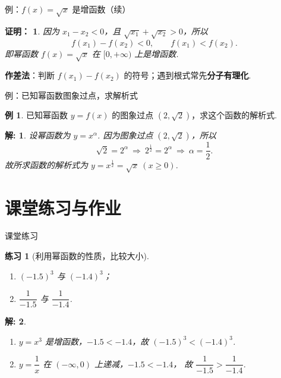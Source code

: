 \documentclass[aspectratio=169,13pt,t] {beamer}
\newtheorem*{prooft}{证明：}
\newtheorem{question}{练习}
\newtheorem*{solve}{解:}
\theoremstyle{definition}
\newtheorem{exam}{例}
\begin{document}
\begin{frame}{例：$f(x)=\sqrt{x}$ 是增函数（续）}
	\begin{prooft}
		因为 $x_{1}-x_{2}<0$，且 $\sqrt{x_{1}}+\sqrt{x_{2}}>0$，所以
		\[
			f(x_{1})-f(x_{2})<0,\qquad f(x_{1})<f(x_{2}).
		\]
		即幂函数 $f(x)=\sqrt{x}$ 在 $[0,+\infty)$ 上是增函数.
	\end{prooft}
	\vspace{1em}
	\begin{summarybox}[方法提炼]
		\textbf{作差法}：判断 $f(x_{1})-f(x_{2})$ 的符号；遇到根式常先\textbf{分子有理化}.
	\end{summarybox}
\end{frame}

\begin{frame}{例：已知幂函数图象过点，求解析式}
	\begin{exam}
		已知幂函数 $y=f(x)$ 的图象过点 $\left(2,\sqrt{2}\right)$，求这个函数的解析式.
	\end{exam}
	\pause
	\begin{solve}
		设幂函数为 $y=x^{\alpha}$. 因为图象过点 $(2,\sqrt{2})$，所以
		\[
			\sqrt{2}=2^{\alpha}\ \Longrightarrow\ 2^{\frac12}=2^{\alpha}\ \Longrightarrow\ \alpha=\frac12.
		\]
		故所求函数的解析式为 $y=x^{\frac12}=\sqrt{x}\ (x\ge 0)$.
	\end{solve}
\end{frame}

\section{课堂练习与作业}

\begin{frame}{课堂练习}
	\begin{question}[利用幂函数的性质，比较大小]
	\begin{enumerate}[(1)]
		\item $(-1.5)^{3}$ 与 $(-1.4)^{3}$；
		\item $\dfrac{1}{-1.5}$ 与 $\dfrac{1}{-1.4}$.
	\end{enumerate}
	\end{question}
	\pause
	\begin{solve}
	\begin{enumerate}[(1)]
		\item $y=x^{3}$ 是增函数，$-1.5<-1.4$，故 $(-1.5)^{3}<(-1.4)^{3}$.
		\item $y=\dfrac{1}{x}$ 在 $(-\infty,0)$ 上递减，$-1.5<-1.4$，
		      故 $\dfrac{1}{-1.5}>\dfrac{1}{-1.4}$.
	\end{enumerate}
	\end{solve}
\end{frame}
\end{document}
